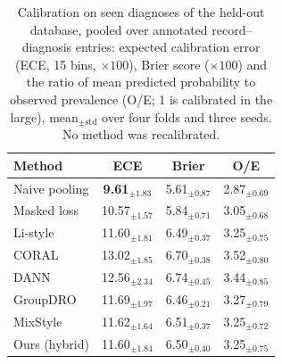 \begin{table}[!htbp]
\centering\footnotesize
\caption{Calibration on seen diagnoses of the held-out database, pooled over annotated record--diagnosis entries: expected calibration error (ECE, 15 bins, $\times100$), Brier score ($\times100$) and the ratio of mean predicted probability to observed prevalence (O/E; 1 is calibrated in the large), mean$_{\pm\mathrm{std}}$ over four folds and three seeds. No method was recalibrated.}\label{tab:calibration}
\begin{tabular}{lccc}
\toprule
Method & ECE & Brier & O/E \\
\midrule
Naive pooling & \textbf{9.61}$_{\pm 1.83}$ & 5.61$_{\pm 0.87}$ & 2.87$_{\pm 0.69}$ \\
Masked loss & 10.57$_{\pm 1.57}$ & 5.84$_{\pm 0.71}$ & 3.05$_{\pm 0.68}$ \\
Li-style & 11.60$_{\pm 1.81}$ & 6.49$_{\pm 0.37}$ & 3.25$_{\pm 0.75}$ \\
CORAL & 13.02$_{\pm 1.85}$ & 6.70$_{\pm 0.38}$ & 3.52$_{\pm 0.80}$ \\
DANN & 12.56$_{\pm 2.34}$ & 6.74$_{\pm 0.45}$ & 3.44$_{\pm 0.85}$ \\
GroupDRO & 11.69$_{\pm 1.97}$ & 6.46$_{\pm 0.21}$ & 3.27$_{\pm 0.79}$ \\
MixStyle & 11.62$_{\pm 1.64}$ & 6.51$_{\pm 0.37}$ & 3.25$_{\pm 0.72}$ \\
\midrule
Ours (hybrid) & 11.60$_{\pm 1.84}$ & 6.50$_{\pm 0.40}$ & 3.25$_{\pm 0.75}$ \\
\bottomrule
\end{tabular}
\end{table}
